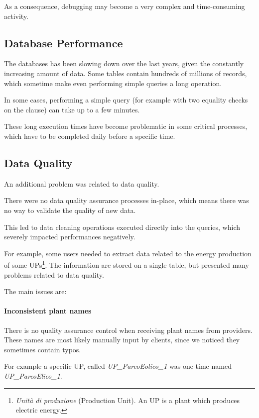         As a consequence, debugging may become a very complex and time-consuming activity.

\subsection{Database Performance}
    The databases has been slowing down over the last years, given the constantly increasing amount of data.
    Some tables contain hundreds of millions of records, which sometime make even performing simple queries a long operation.
    
    In some cases, performing a simple query (for example with two equality checks on the  clause) can take up to a few minutes.
    
    These long execution times have become problematic in some critical processes, which have to be completed daily before a specific time.
    
\subsection{Data Quality}
    An additional problem was related to data quality.
    
    There were no data quality assurance processes in-place, which means there was no way to validate the quality of new data.
    
    This led to data cleaning operations executed directly into the queries, which severely impacted performances negatively.
    
    For example, some users needed to extract data related to the energy production of some UPs\footnote{
        \textit{Unità di produzione} (Production Unit).
        An UP is a plant which produces electric energy.
    }.
    The information are stored on a single table, but presented many problems related to data quality.
    
    The main issues are:
    \paragraph{Inconsistent plant names}
        There is no quality assurance control when receiving plant names from providers.
        These names are most likely manually input by clients, since we noticed they sometimes contain typos.
        
        For example a specific UP, called \textit{UP\_ParcoEolico\_1} was one time named \textit{UP\_ParcoElico\_1}.
        

